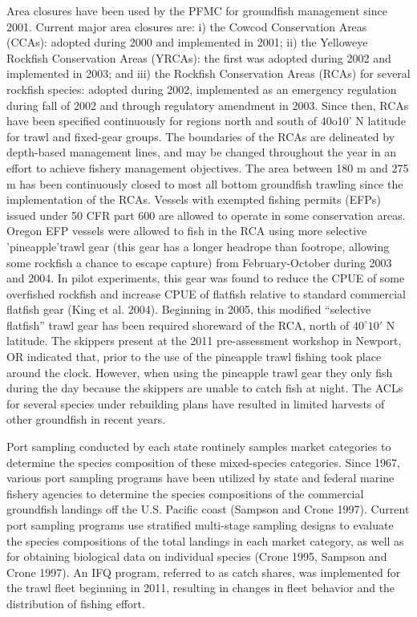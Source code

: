 \documentclass[12pt,]{article}
\begin{document}
Area closures have been used by the PFMC for groundfish management since
2001. Current major area closures are: i) the Cowcod Conservation Areas
(CCAs): adopted during 2000 and implemented in 2001; ii) the Yelloweye
Rockfish Conservation Areas (YRCAs): the first was adopted during 2002
and implemented in 2003; and iii) the Rockfish Conservation Areas (RCAs)
for several rockfish species: adopted during 2002, implemented as an
emergency regulation during fall of 2002 and through regulatory
amendment in 2003. Since then, RCAs have been specified continuously for
regions north and south of 40o10' N latitude for trawl and fixed-gear
groups. The boundaries of the RCAs are delineated by depth-based
management lines, and may be changed throughout the year in an effort to
achieve fishery management objectives. The area between 180 m and 275 m
has been continuously closed to most all bottom groundfish trawling
since the implementation of the RCAs. Vessels with exempted fishing
permits (EFPs) issued under 50 CFR part 600 are allowed to operate in
some conservation areas. Oregon EFP vessels were allowed to fish in the
RCA using more selective 'pineapple'trawl gear (this gear has a longer
headrope than footrope, allowing some rockfish a chance to escape
capture) from February-October during 2003 and 2004. In pilot
experiments, this gear was found to reduce the CPUE of some overfished
rockfish and increase CPUE of flatfish relative to standard commercial
flatfish gear (King et al. 2004). Beginning in 2005, this modified
``selective flatfish'' trawl gear has been required shoreward of the
RCA, north of \(40^\circ10'\) N latitude. The skippers present at the
2011 pre-assessment workshop in Newport, OR indicated that, prior to the
use of the pineapple trawl fishing took place around the clock. However,
when using the pineapple trawl gear they only fish during the day
because the skippers are unable to catch fish at night. The ACLs for
several species under rebuilding plans have resulted in limited harvests
of other groundfish in recent years.

Port sampling conducted by each state routinely samples market
categories to determine the species composition of these mixed-species
categories. Since 1967, various port sampling programs have been
utilized by state and federal marine fishery agencies to determine the
species compositions of the commercial groundfish landings off the U.S.
Pacific coast (Sampson and Crone 1997). Current port sampling programs
use stratified multi-stage sampling designs to evaluate the species
compositions of the total landings in each market category, as well as
for obtaining biological data on individual species (Crone 1995, Sampson
and Crone 1997). An IFQ program, referred to as catch shares, was
implemented for the trawl fleet beginning in 2011, resulting in changes
in fleet behavior and the distribution of fishing effort.
\end{document}
